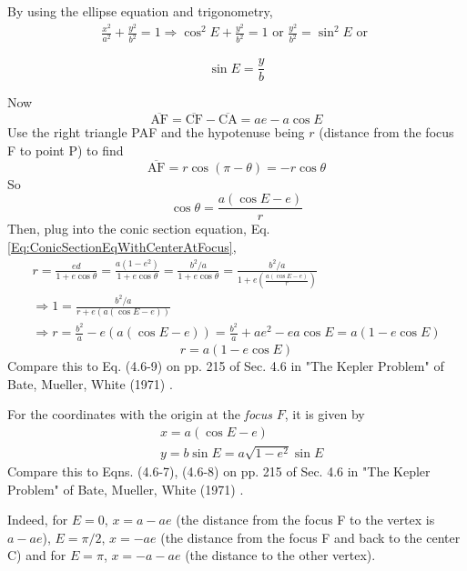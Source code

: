 \documentclass[10pt]{amsart}
\begin{document}
\begin{multicols*}{2}
By using the ellipse equation and trigonometry,
\[
\begin{gathered}
	\frac{x^2}{a^2} + \frac{y^2}{b^2} = 1 \Longrightarrow \cos^2{E}  + \frac{y^2}{b^2} = 1 \text{ or } \frac{y^2}{b^2} = \sin^2{E} \text{ or } 
\end{gathered}
\]

\begin{equation}
\sin{E} = \frac{y}{b}
\end{equation}

Now
\[
\overline{\text{AF}} = \overline{\text{CF}} - \overline{\text{CA}} = ae - a\cos{E}
\]
Use the right triangle PAF and the hypotenuse being $r$ (distance from the focus F to point P) to find
\[
\overline{\text{AF}} = r\cos{(\pi - \theta)} = -r\cos{\theta}
\]
So
\[
\cos{\theta} = \frac{ a ( \cos{E} - e) }{r} 
\]
Then, plug into the conic section equation, Eq. \ref{Eq:ConicSectionEqWithCenterAtFocus}, 
\[
\begin{gathered}
	r = \frac{ed}{ 1 + e\cos{\theta}} = \frac{ a (1-e^2) }{ 1 + e\cos{\theta}} = \frac{b^2 /a}{ 1 + e\cos{\theta}} = \frac{b^2/a}{ 1 + e\left( \frac{ a(\cos{E} - e) }{ r} \right) } \\
		\Longrightarrow 1 = \frac{ b^2 / a}{ r + e(a(\cos{E} - e))} \\
		\Longrightarrow r = \frac{b^2}{a} - e(a(\cos{E} - e)) = \frac{b^2}{a} + ae^2 - ea \cos{E} = a(1 - e \cos{E})
\end{gathered}
\]
\begin{equation}\label{Eq:EllipseEquationWithEccentricAnomaly}
\boxed{ r = a(1 - e\cos{E}) }
\end{equation}
Compare this to Eq. (4.6-9) on pp. 215 of Sec. 4.6 in "The Kepler Problem" of Bate, Mueller, White (1971) \cite{BMW1971}.

For the coordinates with the origin at the \emph{focus} $F$, it is given by 
\begin{equation}\label{Eq:EllipticalPathInEccentricAnomaly}
\begin{aligned}
& x = a(\cos{E} - e) \\
& y = b\sin{E} = a\sqrt{ 1 - e^2} \sin{E}
\end{aligned}
\end{equation}
Compare this to Eqns. (4.6-7), (4.6-8) on pp. 215 of Sec. 4.6 in "The Kepler Problem" of Bate, Mueller, White (1971) \cite{BMW1971}.

Indeed, for $E=0$, $x = a - ae$ (the distance from the focus F to the vertex is $a - ae$), $E = \pi/2$, $x =-ae$ (the distance from the focus F and back to the center C) and for $E = \pi$, $x = -a - ae$ (the distance to the other vertex).


\end{multicols*}
\end{document}
